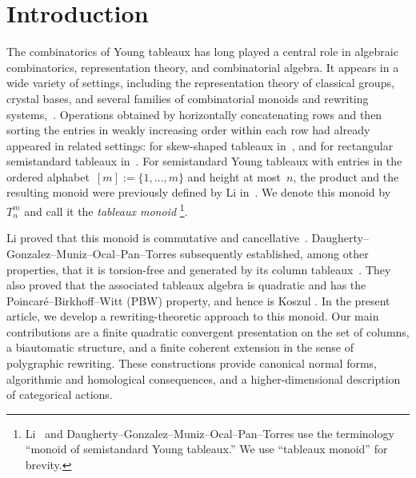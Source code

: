 \documentclass[a4paper, twoside, 11pt, english]{article}
\begin{document}
\vspace{0.5cm} 





\section{Introduction}
\label{S:Introduction}

The combinatorics of Young tableaux has long played a central role in algebraic combinatorics, representation theory, and combinatorial algebra. It appears in a wide variety of settings, including the representation theory of classical groups, crystal bases, and several families of combinatorial monoids and rewriting systems,~\cite{Fulton97,CainGrayMalheiro15,CainGrayMalheiro19,Hage25,Hage2021Super,Hage15,HageMalbos22,HageMalbos17,Hage2022RSK, Hage26}.
Operations obtained by horizontally concatenating rows and then sorting the entries in weakly increasing order within each row had already appeared in related settings: for skew-shaped tableaux in~\cite{Per2016}, and for rectangular
semistandard tableaux in~\cite{ChangDuanFraserLi20}. For semistandard Young tableaux with entries in the ordered
alphabet~$[m]:=\{1,\ldots,m\}$ and height at most~$n$, the product and the resulting monoid were previously defined by Li in~\cite[Section~3]{LiDualCanonical26}. We denote this monoid by~$T_n^m$ and call it the \emph{tableaux monoid}
\footnote{Li~\cite{LiDualCanonical26} and
Daugherty--Gonzalez--Muniz--Ocal--Pan--Torres
\cite{DaughertyGonzalezMunizOcalPanTorres25} use the terminology
``monoid of semistandard Young tableaux.'' We use ``tableaux monoid''
for brevity.}.


Li proved that this monoid is commutative and cancellative~\cite[Lemma~3.2]{LiDualCanonical26}.
Daugherty--Gonzalez--Muniz--Ocal--Pan--Torres subsequently established,
among other properties, that it is torsion-free and generated by its column
tableaux~\cite[Proposition~2.2]
{DaughertyGonzalezMunizOcalPanTorres25}.
They also proved that the associated tableaux algebra is quadratic and has
the Poincar\'e--Birkhoff--Witt (PBW) property, and hence is Koszul
\cite[Theorem~2.13, Corollary~2.14]
{DaughertyGonzalezMunizOcalPanTorres25}.
In the present article, we develop a rewriting-theoretic approach to this
monoid. Our main contributions are a finite quadratic convergent presentation
on the set of columns, a biautomatic structure, and a finite coherent
extension in the sense of polygraphic rewriting. These constructions provide
canonical normal forms, algorithmic and homological consequences, and a
higher-dimensional description of categorical actions.
\end{document}
